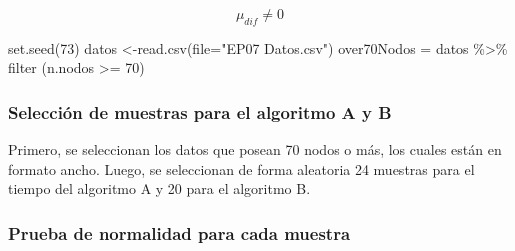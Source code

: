 \documentclass[
]{article}
\newenvironment{Shaded}{\begin{snugshade}}{\end{snugshade}}
\newcommand{\AttributeTok}[1]{\textcolor[rgb]{0.77,0.63,0.00}{#1}}
\newcommand{\CommentTok}[1]{\textcolor[rgb]{0.56,0.35,0.01}{\textit{#1}}}
\newcommand{\DecValTok}[1]{\textcolor[rgb]{0.00,0.00,0.81}{#1}}
\newcommand{\FunctionTok}[1]{\textcolor[rgb]{0.00,0.00,0.00}{#1}}
\newcommand{\NormalTok}[1]{#1}
\newcommand{\OtherTok}[1]{\textcolor[rgb]{0.56,0.35,0.01}{#1}}
\newcommand{\SpecialCharTok}[1]{\textcolor[rgb]{0.00,0.00,0.00}{#1}}
\newcommand{\StringTok}[1]{\textcolor[rgb]{0.31,0.60,0.02}{#1}}
\begin{document}
\[ \mu_{dif}  \neq 0 \]

\begin{Shaded}
\begin{Highlighting}[]
\FunctionTok{set.seed}\NormalTok{(}\DecValTok{73}\NormalTok{)}
\NormalTok{datos }\OtherTok{\textless{}{-}}\FunctionTok{read.csv}\NormalTok{(}\AttributeTok{file=}\StringTok{"EP07 Datos.csv"}\NormalTok{)}
\NormalTok{over70Nodos }\OtherTok{=}\NormalTok{ datos }\SpecialCharTok{\%\textgreater{}\%} \FunctionTok{filter}\NormalTok{ (n.nodos }\SpecialCharTok{\textgreater{}=} \DecValTok{70}\NormalTok{)}
\end{Highlighting}
\end{Shaded}

\hypertarget{selecciuxf3n-de-muestras-para-el-algoritmo-a-y-b}{%
\subsubsection{Selección de muestras para el algoritmo A y
B}\label{selecciuxf3n-de-muestras-para-el-algoritmo-a-y-b}}

Primero, se seleccionan los datos que posean 70 nodos o más, los cuales
están en formato ancho. Luego, se seleccionan de forma aleatoria 24
muestras para el tiempo del algoritmo A y 20 para el algoritmo B.

\begin{Shaded}
\end{Shaded}

\hypertarget{prueba-de-normalidad-para-cada-muestra}{%
\subsubsection{Prueba de normalidad para cada
muestra}\label{prueba-de-normalidad-para-cada-muestra}}
\end{document}
